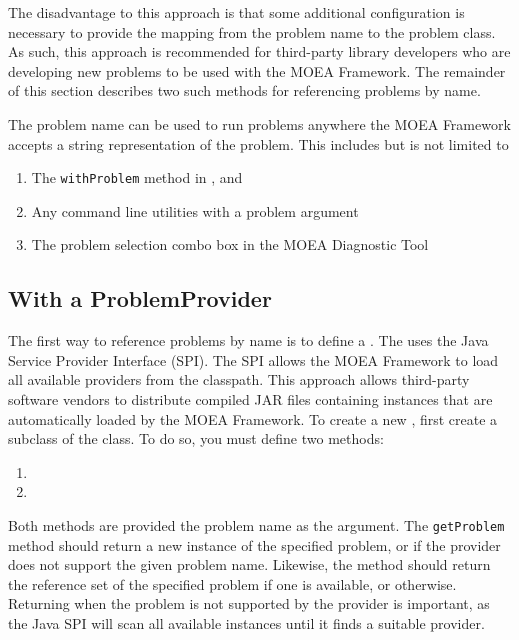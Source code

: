 The disadvantage to this approach is that some additional configuration is necessary to provide the mapping from the problem name to the problem class.  As such, this approach is recommended for third-party library developers who are developing new problems to be used with the MOEA Framework.  The remainder of this section describes two such methods for referencing problems by name.

The problem name can be used to run problems anywhere the MOEA Framework accepts a string representation of the problem.  This includes but is not limited to
\begin{enumerate}
  \item The \texttt{withProblem} method in ,  and 
  \item Any command line utilities with a problem argument
  \item The problem selection combo box in the MOEA Diagnostic Tool
\end{enumerate}

\subsection{With a ProblemProvider}
The first way to reference problems by name is to define a .  The  uses the Java Service Provider Interface (SPI).  The SPI allows the MOEA Framework to load all available providers from the classpath.  This approach allows third-party software vendors to distribute compiled JAR files containing  instances that are automatically loaded by the MOEA Framework.  To create a new , first create a subclass of the  class.  To do so, you must define two methods:
\begin{enumerate}
  \item {}
  \item {}
\end{enumerate}

Both methods are provided the problem name as the argument.  The \texttt{getProblem} method should return a new instance of the specified problem, or  if the provider does not support the given problem name.  Likewise, the  method should return the reference set of the specified problem if one is available, or  otherwise.  Returning  when the problem is not supported by the provider is important, as the Java SPI will scan all available  instances until it finds a suitable provider.


